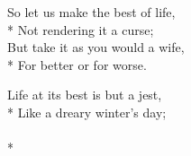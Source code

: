 \versemark
So let us make the best of life,\\*
Not rendering it a curse;\\
But take it as you would a wife,\\*
For better or for worse.

Life at its best is but a jest,\\*
Like a dreary winter’s day;\\
\\*

